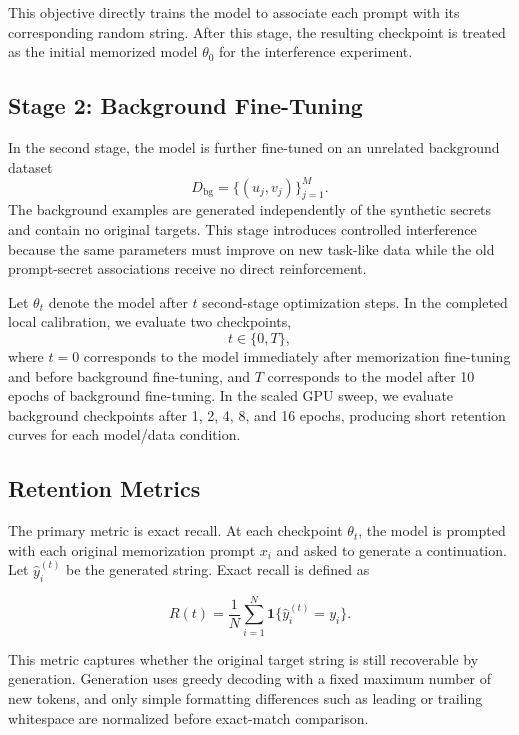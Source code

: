\documentclass{article}
\begin{document}
This objective directly trains the model to associate each prompt with its corresponding random string. After this stage, the resulting checkpoint is treated as the initial memorized model $\theta_0$ for the interference experiment.

\subsection{Stage 2: Background Fine-Tuning}

In the second stage, the model is further fine-tuned on an unrelated background dataset
\[
D_{\mathrm{bg}} = \{(u_j, v_j)\}_{j=1}^{M}.
\]
The background examples are generated independently of the synthetic secrets and contain no original targets. This stage introduces controlled interference because the same parameters must improve on new task-like data while the old prompt-secret associations receive no direct reinforcement.

Let $\theta_t$ denote the model after $t$ second-stage optimization steps. In the completed local calibration, we evaluate two checkpoints,
\[
t \in \{0, T\},
\]
where $t=0$ corresponds to the model immediately after memorization fine-tuning and before background fine-tuning, and $T$ corresponds to the model after 10 epochs of background fine-tuning. In the scaled GPU sweep, we evaluate background checkpoints after 1, 2, 4, 8, and 16 epochs, producing short retention curves for each model/data condition.

\subsection{Retention Metrics}

The primary metric is exact recall. At each checkpoint $\theta_t$, the model is prompted with each original memorization prompt $x_i$ and asked to generate a continuation. Let $\hat{y}_i^{(t)}$ be the generated string. Exact recall is defined as

\begin{equation}
R(t)
=
\frac{1}{N}
\sum_{i=1}^{N}
\mathbf{1}\{\hat y_i^{(t)} = y_i\}.
\end{equation}

This metric captures whether the original target string is still recoverable by generation. Generation uses greedy decoding with a fixed maximum number of new tokens, and only simple formatting differences such as leading or trailing whitespace are normalized before exact-match comparison.
\end{document}
